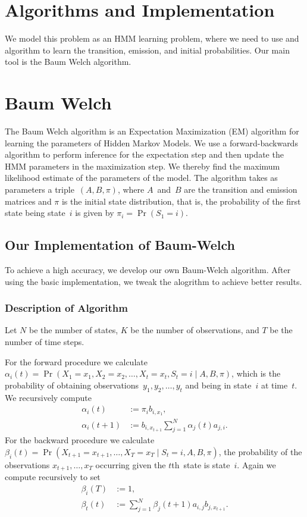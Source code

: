 \documentclass[twoside]{article}
\begin{document}
\section{Algorithms and Implementation}\label{sec:algo-and-impl}

We model this problem as an HMM learning problem, where we need to use and algorithm to learn the transition, emission, and initial probabilities.
Our main tool is the Baum Welch algorithm.

\section{Baum Welch}\label{sec:baum-welch}
The Baum Welch algorithm is an Expectation Maximization (EM) algorithm for learning the parameters of Hidden Markov Models.
We use a forward-backwards algorithm to perform inference for the expectation step and then update the HMM parameters in the maximization step.
We thereby find the maximum likelihood estimate of the parameters of the model.
The algorithm takes as parameters a triple~$(A, B, \pi)$, where $A$~and~$B$ are the transition and emission matrices and $\pi$ is the initial state distribution, that is, the probability of the first state being state~$i$ is given by ${\pi_i = \Pr(S_1 = i)}$.

\subsection{Our Implementation of Baum-Welch}\label{sec:expl-algor}

To achieve a high accuracy, we develop our own Baum-Welch algorithm.
After using the basic implementation, we tweak the alogrithm to achieve better results.

\subsubsection{Description of Algorithm}\label{sec:description-bw}

Let $N$ be the number of states, $K$ be the number of observations, and $T$ be the number of time steps.

For the forward procedure we calculate ${\alpha_i(t) = \Pr(X_1 = x_1, X_2 = x_2, \ldots, X_t = x_t, S_t = i \mid A, B, \pi)}$, which is the probability of obtaining observations~${y_1, y_2, \ldots, y_t}$ and being in state~$i$ at time~$t$.
We recursively compute
\begin{align*}
  \alpha_i (t) &:= \pi_i b_{i, x_1},\\
  \alpha_i (t + 1) &:= b_{i, x_{t+1}} \sum_{j=1}^N \alpha_j(t) a_{j, i}.
\end{align*}
For the backward procedure we calculate ${\beta_i(t) = \Pr(X_{t+1} = x_{t+1}, \ldots, X_T = x_T \mid S_t = i, A, B, \pi)}$, the probability of the observations ${x_{t+1}, \ldots, x_T}$ occurring given the $t$th~state is state~$i$.
Again we compute recursively to set
\begin{align*}
  \beta_i(T) &:= 1,\\
  \beta_t(t) &:= \sum_{j=1}^N \beta_j(t+1) a_{i, j} b_{j, x_{t+1}}.
\end{align*}
\end{document}
